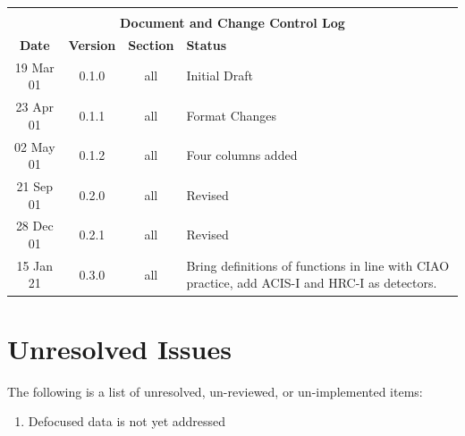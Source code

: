 \documentclass[twoside]{article}
\begin{document}
\begin{center}
\begin{tabular}{|c|c|c|p{2.5in}|} \hline
\multicolumn{4}{|c|}{}\\[1mm]
\multicolumn{4}{|c|}{\bf Document and Change Control Log}\\[3mm]\hline
{\bf Date} & {\bf Version} & {\bf Section} & {\bf Status} \\ \hline
19 Mar 01& 0.1.0& all&Initial Draft \\\hline
23 Apr 01& 0.1.1& all&Format Changes \\\hline
02 May 01& 0.1.2& all&Four columns added \\\hline
21 Sep 01& 0.2.0& all&Revised \\\hline
28 Dec 01& 0.2.1& all&Revised \\\hline
15 Jan 21& 0.3.0& all & Bring definitions of functions in line with CIAO practice, add ACIS-I and HRC-I as detectors. \\\hline
%
\hline
%
\end{tabular}
\end{center}

\section*{Unresolved Issues}

The following is a list of unresolved, un-reviewed, or un-implemented
items: 

\begin{enumerate}

\item Defocused data is not yet addressed

\end{enumerate}

\clearpage


\end{document}
